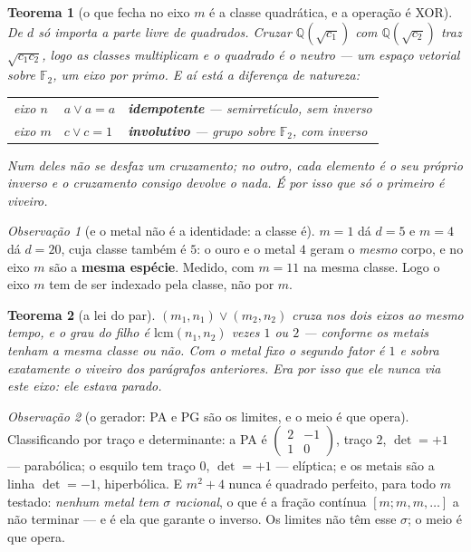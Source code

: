 \documentclass[11pt]{article}
\newcommand{\Q}{\mathbb Q}
\theoremstyle{plain}
\newtheorem{teorema}{Teorema}
\theoremstyle{remark}
\newtheorem{obs}{Observação}
\providecommand{\Fp}{\ensuremath{\mathbb F}}
\begin{document}
\begin{teorema}[o que fecha no eixo $m$ é a classe quadrática, e a operação é XOR]
De $d$ só importa a parte livre de quadrados. Cruzar $\Q(\sqrt{c_1})$ com $\Q(\sqrt{c_2})$ traz
$\sqrt{c_1c_2}$, logo as classes \emph{multiplicam} e o quadrado é o neutro --- um espaço vetorial
sobre $\Fp_2$, um eixo por primo. E aí está a diferença de natureza:
\begin{center}
\begin{tabular}{lll}
\toprule
eixo $n$ & $a\vee a=a$ & \textbf{idempotente} --- semirretículo, sem inverso\\
eixo $m$ & $c\vee c=1$ & \textbf{involutivo} --- grupo sobre $\Fp_2$, com inverso\\
\bottomrule
\end{tabular}
\end{center}
Num deles não se desfaz um cruzamento; no outro, cada elemento é o seu próprio inverso e o
cruzamento consigo devolve o \emph{nada}. É por isso que só o primeiro é viveiro.
\end{teorema}

\begin{obs}[e o metal não é a identidade: a classe é]
$m=1$ dá $d=5$ e $m=4$ dá $d=20$, cuja classe também é $5$: o ouro e o metal $4$ geram o
\emph{mesmo} corpo, e no eixo $m$ são a \textbf{mesma espécie}. Medido, com $m=11$ na mesma
classe. Logo o eixo $m$ tem de ser indexado pela classe, não por $m$.
\end{obs}

\begin{teorema}[a lei do par]
$(m_1,n_1)\vee(m_2,n_2)$ cruza nos dois eixos ao mesmo tempo, e o grau do filho é
$\mathrm{lcm}(n_1,n_2)$ vezes $1$ ou $2$ --- conforme os metais tenham a mesma classe ou não. Com o
metal fixo o segundo fator é $1$ e sobra exatamente o viveiro dos parágrafos anteriores. \emph{Era
por isso que ele nunca via este eixo: ele estava parado.}
\end{teorema}

\begin{obs}[o gerador: PA e PG são os limites, e o meio é que opera]
Classificando por traço e determinante: a PA é $\left(\begin{smallmatrix}2&-1\\1&0\end{smallmatrix}
\right)$, traço $2$, $\det=+1$ --- parabólica; o esquilo tem traço $0$, $\det=+1$ --- elíptica; e os
metais são a linha $\det=-1$, hiperbólica. E $m^2+4$ nunca é quadrado perfeito, para todo $m$
testado: \emph{nenhum metal tem $\sigma$ racional}, o que é a fração contínua $[m;m,m,\dots]$ a não
terminar --- e é ela que garante o inverso. Os limites não têm esse $\sigma$; o meio é que opera.
\end{obs}
\end{document}
